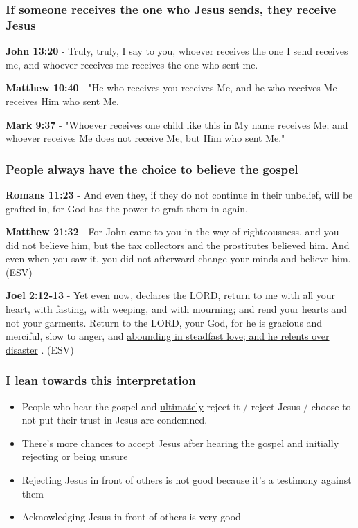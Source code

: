 \documentclass[11pt]{article}
\begin{document}
\subsubsection{If someone receives the one who Jesus sends, they receive Jesus}
\label{sec:org4c3dfb1}
\textbf{John 13:20} - Truly, truly, I say to you, whoever receives the one I send receives me, and whoever receives me receives the one who sent me.

\textbf{Matthew 10:40} - "He who receives you receives Me, and he who receives Me receives Him who sent Me.

\textbf{Mark 9:37} - "Whoever receives one child like this in My name receives Me; and whoever receives Me does not receive Me, but Him who sent Me."

\subsubsection{People always have the choice to believe the gospel}
\label{sec:org3f9b7b1}
\textbf{Romans 11:23} - And even they, if they do not continue in their unbelief, will be grafted in, for God has the power to graft them in again.

\textbf{Matthew 21:32} - For John came to you in the way of righteousness, and you did not believe him, but the tax collectors and the prostitutes believed him. And even when you saw it, you did not afterward change your minds and believe him. (ESV)

\textbf{Joel 2:12-13} - Yet even now, declares the LORD, return to me with all your heart, with fasting, with weeping, and with mourning; and rend your hearts and not your garments. Return to the LORD, your God, for he is gracious and merciful, slow to anger, and \uline{abounding in steadfast love; and he relents over disaster} . (ESV)

\subsubsection{I lean towards this interpretation}
\label{sec:org85e6518}
\begin{itemize}
\item People who hear the gospel and \uline{ultimately} reject it / reject Jesus / choose to not put their trust in Jesus are condemned.
\item There's more chances to accept Jesus after hearing the gospel and initially rejecting or being unsure
\item Rejecting Jesus in front of others is not good because it's a testimony against them
\item Acknowledging Jesus in front of others is very good
\end{itemize}
\end{document}

